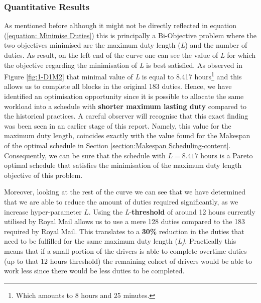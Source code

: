 
\subsubsection*{Quantitative Results}
As mentioned before although it might not be directly reflected in equation (\ref{equation: Minimise Duties}) this is principally a Bi-Objective problem where the two objectives minimised are the maximum duty length (\textit{L}) and the number of duties. As result, on the left end of the curve one can see the value of \textit{L} for which the objective regarding the minimisation of \textit{L} is best satisfied. As observed in Figure \ref{fig:1-D1M2} that minimal value of \textit{L} is equal to 8.417 hours\footnote{Which amounts to 8 hours and 25 minutes.} and this allows us to complete all blocks in the original 183 duties. Hence, we have identified an optimisation opportunity since it is possible to allocate the same workload into a schedule with \textbf{shorter maximum lasting duty} compared to the historical practices. A careful observer will recognise that this exact finding was been seen in an earlier stage of this report. Namely, this value for the maximum duty length, coincides exactly with the value found for the Makespan of the optimal schedule in Section \ref{section:Makespan Scheduling-content}. Consequently, we can be sure that the schedule with $L=8.417 \text{ hours}$ is a Pareto optimal schedule that satisfies the minimisation of the maximum duty length objective of this problem.

\vspace{\baselineskip}
\noindent
Moreover, looking at the rest of the curve we can see that we have determined that we are able to reduce the amount of duties required significantly, as we increase hyper-parameter $L$. Using the \textit{L}-\textbf{threshold} of around 12 hours currently utilised by Royal Mail allows us to use a mere 128 duties compared to the 183 required by Royal Mail. This translates to a \textbf{30\%} reduction in the duties that need to be fulfilled for the same maximum duty length (\textit{L)}. Practically this means that if a small portion of the drivers is able to complete overtime duties (up to that 12 hours threshold) the remaining cohort of drivers would be able to work less since there would be less duties to be completed. 


